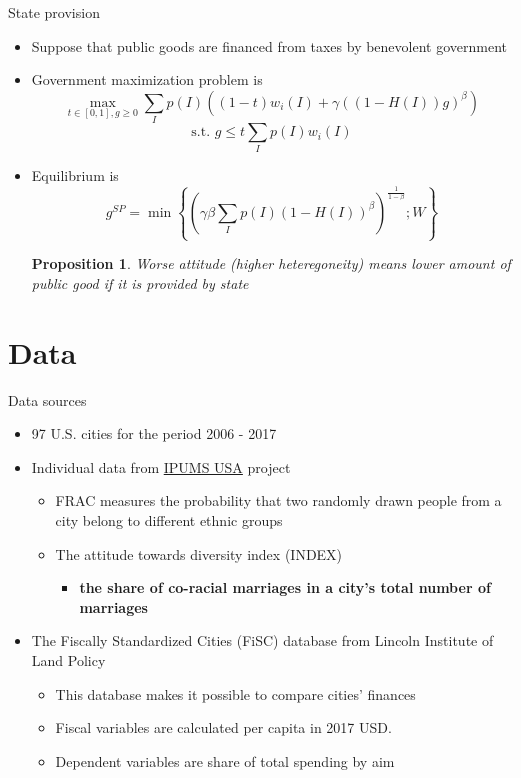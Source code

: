 \documentclass[c]{beamer}  %
\newtheorem{proposition}{Proposition}
\begin{document}
    \begin{frame}[allowframebreaks]{State provision}
        \begin{itemize}
            \item Suppose that public goods are financed from taxes by benevolent government
            \item Government maximization problem is 
            \[ \max_{t\in[0,1], g\ge 0} \sum_{I} p(I) ( (1-t)w_i(I) + \gamma( (1 - H(I)) g)^\beta)  \]
            \[\text{s.t. } g \le t\sum_{I} p(I) w_i(I)  \]
            \pause
            \item Equilibrium is
            \[ g^{SP} = \min \left\{ \left( \gamma  \beta\sum_{I} p(I) (1 - H(I))^\beta \right)^\frac{1}{1 - \beta}; W \right\} \]
            \pause
            \begin{proposition}
            Worse attitude (higher heteregoneity) means lower amount of public good if it is provided by state 
            \end{proposition}
        \end{itemize}
    \end{frame}
    
    \section{Data}
    
    \begin{frame}{Data sources}
        \begin{itemize}
            \item 97 U.S. cities for the period 2006 - 2017
            \pause
            \item Individual data from \hyperlink{https://usa.ipums.org/usa/}{IPUMS USA} project
            \begin{itemize}
                \item FRAC measures the probability that two randomly drawn people from a city belong to different ethnic groups
                \pause
                \item The attitude towards diversity index (INDEX)
                \begin{itemize}
                    \item \textbf{the share of co-racial marriages in a city's total number of marriages}
                \end{itemize}
            \end{itemize}
            \pause
        \item The Fiscally Standardized Cities (FiSC) database from Lincoln Institute of Land Policy
        \begin{itemize}
            \item This database makes it possible to compare cities' finances
            \item Fiscal variables are calculated per capita in 2017 USD.
            \item Dependent variables are share of total spending by aim
        \end{itemize}
        \end{itemize}
    \end{frame}
    
\end{document}
